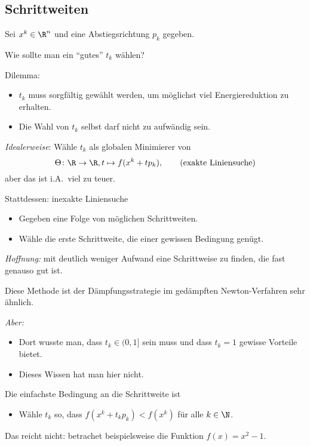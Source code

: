 \subsection{Schrittweiten}
Sei $x^k \in \R^n$ und eine Abstiegsrichtung $p_k$ gegeben.

Wie sollte man ein "`gutes"' $t_k$ wählen?

Dilemma:
\begin{itemize}
	\item $t_k$ muss sorgfältig gewählt werden, um möglichst viel Energiereduktion zu erhalten.
	\item Die Wahl von $t_k$ selbst darf nicht zu aufwändig sein.
\end{itemize}
\emph{Idealerweise}: Wähle $t_k$ als globalen Minimierer von
\begin{equation*}
 \Theta \colon \R \to \R, t \mapsto f(x^k+tp_k),
 \qquad
 \text{(exakte Liniensuche)}
\end{equation*}
aber das ist i.A.\ viel zu teuer.

Stattdessen: inexakte Liniensuche
\begin{itemize}
 \item Gegeben eine Folge von möglichen Schrittweiten.
 \item Wähle die erste Schrittweite, die einer gewissen Bedingung genügt.
\end{itemize}
\emph{Hoffnung:} mit deutlich weniger Aufwand eine Schrittweise zu finden, die fast genauso gut ist.

\bigskip

Diese Methode ist der Dämpfungsstrategie im gedämpften Newton-Verfahren sehr ähnlich.

\emph{Aber:}
\begin{itemize}
 \item Dort wusste man, dass $t_k \in (0,1]$ sein muss und dass $t_k=1$ gewisse Vorteile bietet.
 \item Dieses Wissen hat man hier nicht.
\end{itemize}
Die einfachste Bedingung an die Schrittweite ist
\begin{itemize}
\item Wähle $t_k$ so, dass $f (x^k+t_kp_k) < f(x^k)$ für alle $k \in \N$.
\end{itemize}
Das reicht nicht: betrachet beispielsweise die Funktion $f(x)=x^2-1$.




